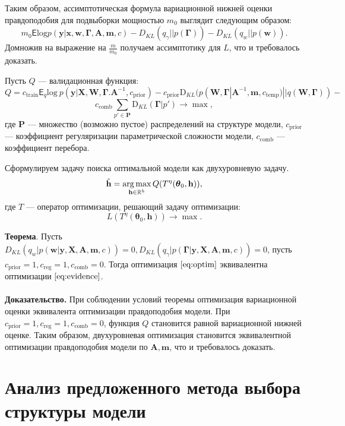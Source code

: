 Таким образом, ассимптотическая формула вариационной нижней оценки правдоподобия для подвыборки мощностью $m_0$ выглядит следующим образом:
\[
m_0\mathsf{E}\text{log} p(\mathbf{y}|{\mathbf{x}},\mathbf{w}, \boldsymbol{\Gamma}, \mathbf{A},\mathbf{m}, c) - {D_{KL}}(q_\gamma||p(\boldsymbol{\Gamma})) - {D_{KL}}(q_{w}||p(\mathbf{w})).
\]
Домножив на выражение на $\frac{m}{m_0}$ получаем ассимптотику для $L$, что и требовалось доказать.

Пусть $Q$ --- валидационная функция:
\[
Q = {c_\text{train}\mathsf{E}_q \text{log}~{p(\mathbf{y} | \mathbf{X}, \mathbf{W}, \boldsymbol{\Gamma}. \mathbf{A}^{-1}, c_{\text{prior}})}}
 - {c_\text{prior}\text{D}_{KL}(p(\mathbf{W}, \boldsymbol{\Gamma} |\mathbf{A}^{-1}, \mathbf{m}, c_{\text{temp}}) || q(\mathbf{W}, \boldsymbol{\Gamma}))} -\]
\[
{c_{\text{comb}}\sum_{p' \in \mathbf{P}} \text{D}_{KL}(\boldsymbol{\Gamma} | p')} \to \max, 
\]
где $\mathbf{P}$ --- множество (возможно пустое) распределений на структуре модели, $c_\text{prior}$ --- коэффициент регуляризации параметрической сложности модели, 
$c_{\text{comb}}$ --- коэффициент перебора.

Сформулируем задачу поиска оптимальной модели как двухуровневую задачу.
\begin{equation}
\label{eq:optim}
	\hat{\mathbf{h}} = \operatorname*{arg\,max}_{\mathbf{h} \in \mathbb{R}^h} Q( T^\eta(\boldsymbol{\theta}_0, \mathbf{h})),
\end{equation}
где $T$ --- оператор оптимизации, решающий задачу оптимизации:
\[
    L(T^\eta(\boldsymbol{\theta}_0, \mathbf{h})) \to \max.
\]


\textbf{Теорема}. Пусть $D_{KL}(q_w|p(\mathbf{w}|\mathbf{y}, \mathbf{X}, \mathbf{A},\mathbf{m}, c)) = 0, D_{KL}(q_\gamma|p(\boldsymbol{\Gamma}|\mathbf{y}, \mathbf{X}, \mathbf{A},\mathbf{m}, c)) = 0$, пусть $c_{\text{prior}} = 1, c_{\text{reg}} = 1, c_{\text{comb}} = 0$. Тогда оптимизация $\eqref{eq:optim}$ эквивалентна оптимизации $\eqref{eq:evidence}$.\\~\\
\textbf{Доказательство.} При соблюдении условий теоремы оптимизация вариационной оценки эквивалента оптимизации правдоподобия модели.
При $c_{\text{prior}} = 1, c_{\text{reg}} = 1, c_{\text{comb}} = 0$, функция $Q$ становится равной вариационной нижней оценке. 
Таким образом, двухуровневая оптимизация становится эквивалентной оптимизации правдоподобия модели по $\mathbf{A},\mathbf{m}$, что и требовалось доказать.

\section{Анализ предложенного метода выбора структуры модели}

